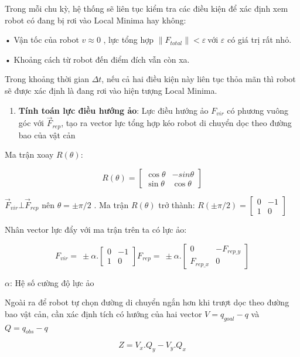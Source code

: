 \documentclass[12pt,a4paper,oneside]{report}
\begin{document}
Trong mỗi chu kỳ, hệ thống sẽ liên tục kiểm tra các điều kiện để xác định xem robot có đang bị rơi vào Local Minima hay không:

• Vận tốc của robot \(v \approx 0\) , lực tổng hợp \(\left\| F_{total} \right\| < \varepsilon\ \)với \(\varepsilon\) có giá trị rất nhỏ.

• Khoảng cách từ robot đến điểm đích vẫn còn xa.

Trong khoảng thời gian \(\Delta t\), nếu cả hai điều kiện này liên tục thỏa mãn thì robot sẽ được xác định là đang rơi vào hiện tượng Local Minima.

\begin{enumerate}
\def\labelenumi{\arabic{enumi}.}
\setcounter{enumi}{1}
\item
  \textbf{Tính toán lực điều hướng ảo}: Lực điều hướng ảo \(F_{vir}\) có phương vuông góc với \({\overrightarrow{F}}_{rep}\), tạo ra vector lực tổng hợp kéo robot di chuyển dọc theo đường bao của vật cản
\end{enumerate}

Ma trận xoay \(R(\theta)\):

\[R(\theta) = \begin{bmatrix}
\cos\theta & - sin\theta \\
\sin\theta & \cos\theta
\end{bmatrix}\]

\({\overrightarrow{F}}_{vir}\bot{\overrightarrow{F}}_{rep}\) nên \(\theta = \pm \pi/2\) . Ma trận \(R(\theta)\) trở thành: \(R( \pm \pi/2) = \begin{bmatrix}
0 & - 1 \\
1 & 0
\end{bmatrix}\)

Nhân vector lực đẩy với ma trận trên ta có lực ảo:

\[F_{vir} = \  \pm \alpha.\begin{bmatrix}
0 & - 1 \\
1 & 0
\end{bmatrix}F_{rep} = \  \pm \alpha.\begin{bmatrix}
0 & {- F}_{rep\_ y} \\
F_{rep\_ x} & 0
\end{bmatrix}\]

\(\alpha\): Hệ số cường độ lực ảo

Ngoài ra để robot tự chọn đường di chuyển ngắn hơn khi trượt dọc theo đường bao vật cản, cần xác định tích có hướng của hai vector \(V = q_{goal} - q\) và \(Q = q_{obs} - q\)

\[Z = V_{x}.Q_{y} - V_{y}.Q_{x}\]
\end{document}
